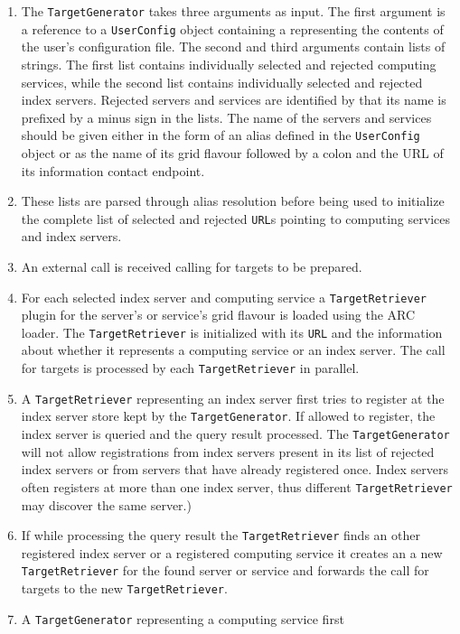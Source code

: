 \documentclass{book}
\newcommand{\TargetGenerator}{\texttt{TargetGenerator}}
\newcommand{\TargetRetriever}{\texttt{TargetRetriever}}
\newcommand{\URL}{\texttt{URL}}
\newcommand{\UserConfig}{\texttt{UserConfig}}
\begin{document}
\begin{enumerate}
\item{The {\TargetGenerator} takes three arguments as input. The first
  argument is a reference to a {\UserConfig} object containing a
  representing the contents of the user's configuration file. The
  second and third arguments contain lists of strings. The first list
  contains individually selected and rejected computing services,
  while the second list contains individually selected and rejected
  index servers. Rejected servers and services are identified by that
  its name is prefixed by a minus sign in the lists. The name of the
  servers and services should be given either in the form of an alias
  defined in the {\UserConfig} object or as the name of its grid
  flavour followed by a colon and the URL of its information contact
  endpoint.}
\item{These lists are parsed through alias resolution before being
  used to initialize the complete list of selected and rejected
  {\URL}s pointing to computing services and index servers.}
\item{An external call is received calling for targets to be
  prepared.}
\item{For each selected index server and computing service a
  {\TargetRetriever} plugin for the server's or service's grid flavour
  is loaded using the ARC loader. The {\TargetRetriever} is
  initialized with its {\URL} and the information about whether it
  represents a computing service or an index server. The call for
  targets is processed by each {\TargetRetriever} in parallel.}
\item{A {\TargetRetriever} representing an index server first tries to
  register at the index server store kept by the {\TargetGenerator}.
  If allowed to register, the index server is queried and the query
  result processed. The {\TargetGenerator} will not allow
  registrations from index servers present in its list of rejected
  index servers or from servers that have already registered
  once. Index servers often registers at more than one index server,
  thus different {\TargetRetriever} may discover the same server.)}
\item{If while processing the query result the {\TargetRetriever}
  finds an other registered index server or a registered computing
  service it creates an a new {\TargetRetriever} for the found server
  or service and forwards the call for targets to the new
  {\TargetRetriever}.}
\item{A {\TargetGenerator} representing a computing service first
}
\end{enumerate}
\end{document}
